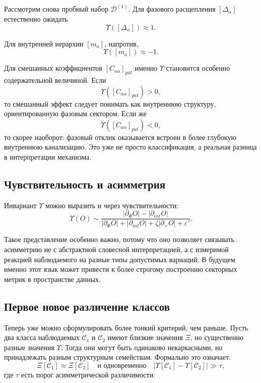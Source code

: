 \documentclass[12pt,a4paper]{article}
\begin{document}
Рассмотрим снова пробный набор \(\mathcal{D}^{(1)}\). Для фазового расщепления \([\Delta_{\alpha}]\) естественно ожидать
\begin{equation}
\Upsilon([\Delta_{\alpha}]) \approx 1.
\end{equation}

Для внутренней иерархии \([m_a]\), напротив,
\begin{equation}
\Upsilon([m_a]) \approx -1.
\end{equation}

Для смешанных коэффициентов \([C_{a\alpha}]_{pat}\) именно \(\Upsilon\) становится особенно содержательной величиной. Если
\begin{equation}
\Upsilon([C_{a\alpha}]_{pat}) > 0,
\end{equation}
то смешанный эффект следует понимать как внутреннюю структуру, ориентированную фазовым сектором. Если же
\begin{equation}
\Upsilon([C_{a\alpha}]_{pat}) < 0,
\end{equation}
то скорее наоборот: фазовый отклик оказывается встроен в более глубокую внутреннюю канализацию. Это уже не просто классификация, а реальная разница в интерпретации механизма.

\subsection{Чувствительность и асимметрия}

Инвариант \(\Upsilon\) можно выразить и через чувствительности:
\begin{equation}
\Upsilon(O) \sim
\frac{|\partial_{\Phi} O| - |\partial_{int} O|}{|\partial_{\Phi} O| + |\partial_{int} O| + \zeta |\partial_{\times} O| + \varepsilon'}.
\end{equation}

Такое представление особенно важно, потому что оно позволяет связывать асимметрию не с абстрактной словесной интерпретацией, а с измеримой реакцией наблюдаемого на разные типы допустимых вариаций. В будущем именно этот язык может привести к более строгому построению секторных метрик в пространстве данных.

\subsection{Первое новое различение классов}

Теперь уже можно сформулировать более тонкий критерий, чем раньше. Пусть два класса наблюдаемых \(\mathcal{C}_1\) и \(\mathcal{C}_2\) имеют близкие значения \(\Xi\), но существенно разные значения \(\Upsilon\). Тогда они могут быть одинаково некаркасными, но принадлежать разным структурным семействам. Формально это означает:
\begin{equation}
\Xi[\mathcal{C}_1] \approx \Xi[\mathcal{C}_2]
\quad \text{и одновременно} \quad
|\Upsilon[\mathcal{C}_1] - \Upsilon[\mathcal{C}_2]| \gg \tau,
\end{equation}
где \(\tau\) есть порог асимметрической различимости.
\end{document}
